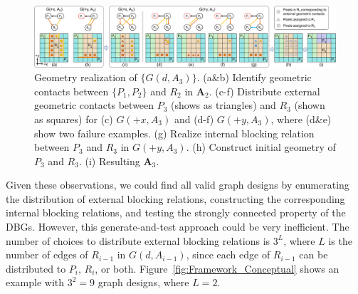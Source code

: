 \begin{figure}[!t]
	\centering
	\includegraphics[width=17.80cm]{images/Framework_Geometry.png}
	\vspace*{-2.5mm}
	\caption{
		Geometry realization of $\{G(d, A_3)\}$.
		(a\&b) Identify geometric contacts between $\{P_1, P_2\}$ and $R_2$ in $\mathbf{A}_2$.
		(c-f) Distribute external geometric contacts between $P_3$ (shows as triangles) and $R_3$ (shown as squares) for (c) $G(+x, A_3)$ and (d-f) $G(+y, A_3)$,
		where (d\&e) show two failure examples.
		(g) Realize internal blocking relation between $P_3$ and $R_3$ in $G(+y, A_3)$.
		(h) Construct initial geometry of $P_3$ and $R_3$.
		(i) Resulting $\mathbf{A}_3$.
	}
	\vspace*{-2.0mm}
	\label{fig:Framework_Geometry}
\end{figure}

\vspace*{-1.0mm}
Given these observations, we could find all valid graph designs by enumerating the distribution of external blocking relations, constructing the corresponding internal blocking relations, and testing the strongly connected property of the DBGs.
However, this generate-and-test approach could be very inefficient. The number of choices to distribute external blocking relations is $3^L$, where $L$ is the number of  edges of $R_{i-1}$ in $G(d, A_{i-1})$, since each edge of $R_{i-1}$ can be distributed to $P_i$, $R_i$, or both.
Figure~\ref{fig:Framework_Conceptual} shows an example with $3^2 =9$ graph designs, where $L=2$.



